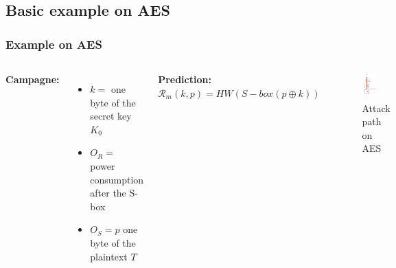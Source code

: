 \documentclass{beamer}
\begin{document}
	\subsection{Basic example on AES}
	\begin{frame}
		\frametitle{Example on AES}
		
		\begin{columns}
			\textbf{Campagne:}\\
			\begin{itemize}
				\item $k = $ one byte of the secret key $K_0$
				\item $O_R = $ power consumption after the S-box
				\item $O_S = p$ one byte of the plaintext $T$
			\end{itemize}
			
			\textbf{Prediction:}\\
			$\mathcal{R}_m(k,p) = HW(S-box(p \oplus k))$
			\begin{figure}
				\includegraphics[width=0.5\textwidth]{attack_path_aes}
				\caption{Attack path on AES}
			\end{figure}
			

\end{columns}
\end{frame}
\end{document}
